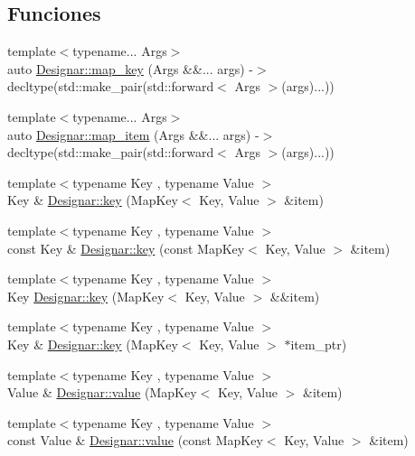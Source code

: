 \subsection*{Funciones}
\begin{DoxyCompactItemize}
\item 
{\footnotesize template$<$typename... Args$>$ }\\auto \hyperlink{namespace_designar_ae056f21d6632882d928c2452439836c9}{Designar\+::map\+\_\+key} (Args \&\&... args) -\/$>$ decltype(std\+::make\+\_\+pair(std\+::forward$<$ Args $>$(args)...))
\item 
{\footnotesize template$<$typename... Args$>$ }\\auto \hyperlink{namespace_designar_a1a0ef2d0cfea5299ec7b7ecf420665f2}{Designar\+::map\+\_\+item} (Args \&\&... args) -\/$>$ decltype(std\+::make\+\_\+pair(std\+::forward$<$ Args $>$(args)...))
\item 
{\footnotesize template$<$typename Key , typename Value $>$ }\\Key \& \hyperlink{namespace_designar_ae26ed0e58d724f576ed6faecb606265b}{Designar\+::key} (Map\+Key$<$ Key, Value $>$ \&item)
\item 
{\footnotesize template$<$typename Key , typename Value $>$ }\\const Key \& \hyperlink{namespace_designar_aa8f8b118fb59d977b693196954abca76}{Designar\+::key} (const Map\+Key$<$ Key, Value $>$ \&item)
\item 
{\footnotesize template$<$typename Key , typename Value $>$ }\\Key \hyperlink{namespace_designar_a02dd98d2c308a1eb7f11ec2e5cb1b382}{Designar\+::key} (Map\+Key$<$ Key, Value $>$ \&\&item)
\item 
{\footnotesize template$<$typename Key , typename Value $>$ }\\Key \& \hyperlink{namespace_designar_afbf77bb89fda57c01717bcff7290fa1b}{Designar\+::key} (Map\+Key$<$ Key, Value $>$ $\ast$item\+\_\+ptr)
\item 
{\footnotesize template$<$typename Key , typename Value $>$ }\\Value \& \hyperlink{namespace_designar_a7dd2a7b6d96f664ce612b506c8eb2fb8}{Designar\+::value} (Map\+Key$<$ Key, Value $>$ \&item)
\item 
{\footnotesize template$<$typename Key , typename Value $>$ }\\const Value \& \hyperlink{namespace_designar_a0b1fbaad8d9cadc07bd73cd65baf6b3f}{Designar\+::value} (const Map\+Key$<$ Key, Value $>$ \&item)

\end{DoxyCompactItemize}

